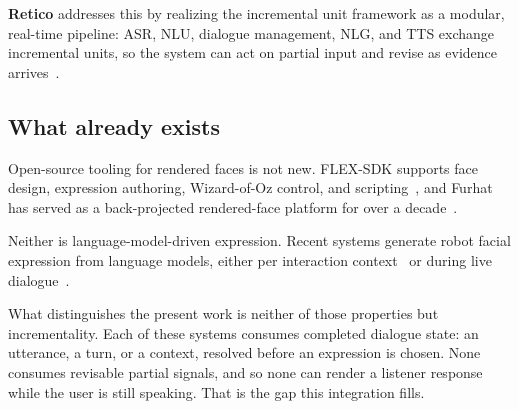 \documentclass[conference]{IEEEtran}
\begin{document}
\textbf{Retico} addresses this by realizing the incremental unit framework as
a modular, real-time pipeline: ASR, NLU, dialogue management, NLG, and TTS
exchange incremental units, so the system can act on partial input and revise
as evidence arrives~\cite{michael2020retico,schlangen2011iu}.

\subsection{What already exists}

Open-source tooling for rendered faces is not new. FLEX-SDK supports face
design, expression authoring, Wizard-of-Oz control, and
scripting~\cite{alvesoliveira2022flexsdk}, and Furhat has served as a
back-projected rendered-face platform for over a
decade~\cite{almoubayed2012furhat}.

Neither is language-model-driven expression. Recent systems generate robot
facial expression from language models, either per interaction
context~\cite{antony2025xpress} or during live
dialogue~\cite{expressivefurhat2026,fluidxpress2026,hasumoto2023llmemotion}.

What distinguishes the present work is neither of those properties but
incrementality. Each of these systems consumes completed dialogue state: an
utterance, a turn, or a context, resolved before an expression is chosen.
None consumes revisable partial signals, and so none can render a listener
response while the user is still speaking. That is the gap this integration
fills.
\end{document}
